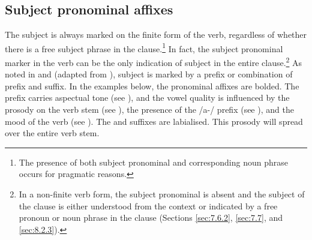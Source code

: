 \begin{table}
\caption{Pronominals}\label{tab:55}
\end{table}

\subsection{Subject pronominal affixes}\label{sec:7.3.1}
\hypertarget{RefHeading1212161525720847}{}
The subject is always marked on the finite form of the verb, regardless of whether there is a free subject phrase in the clause.\footnote{The presence of both subject pronominal and corresponding noun phrase occurs for pragmatic reasons.}  In fact, the subject pronominal marker in the verb can be the only indication of subject in the entire clause.\footnote{In a non-finite verb form, the subject pronominal is absent and the subject of the clause is either understood from the context or indicated by a free pronoun or noun phrase in the clause (Sections \ref{sec:7.6.2}, \ref{sec:7.7}, and \ref{sec:8.2.3}).} As noted in  and  (adapted from \citealt{FriesenMamalis2008}), subject is marked by a prefix or combination of prefix and suffix. In the examples below, the pronominal affixes are bolded. The prefix carries aspectual tone (see ), and the vowel quality is influenced by the prosody on the verb stem (see ), the presence of the /a-/ prefix (see ), and the mood of the verb (see ). The \oneP and {\twoP} suffixes are labialised. This prosody will spread over the entire verb stem. 

